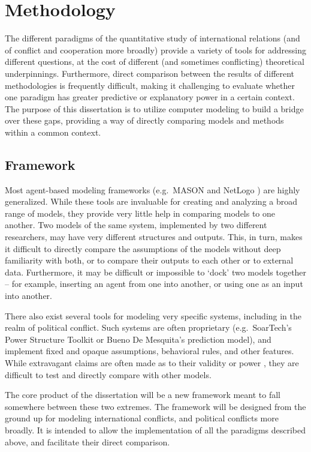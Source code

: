 \section{Methodology}\label{methodology}

The different paradigms of the quantitative study of international relations (and of conflict and cooperation more broadly) provide a variety of tools for addressing different questions, at the cost of different (and sometimes conflicting) theoretical underpinnings. Furthermore, direct comparison between the results of different methodologies is frequently difficult, making it challenging to evaluate whether one paradigm has greater predictive or explanatory power in a certain context. The purpose of this dissertation is to utilize computer modeling to build a bridge over these gaps, providing a way of directly comparing models and methods within a common context.

\subsection{Framework}\label{framework}

Most agent-based modeling frameworks (e.g.~MASON \citep{luke_2005} and NetLogo \citep{wilensky_1999}) are highly generalized. While these tools are invaluable for creating and analyzing a broad range of models, they provide very little help in comparing models to one another. Two models of the same system, implemented by two different researchers, may have very different structures and outputs. This, in turn, makes it difficult to directly compare the assumptions of the models without deep familiarity with both, or to compare their outputs to each other or to external data. Furthermore, it may be difficult or impossible to `dock' \citep{axtell_1996} two models together -- for example, inserting an agent from one into another, or using one as an input into another.

There also exist several tools for modeling very specific systems, including in the realm of political conflict. Such systems are often proprietary (e.g.~SoarTech's Power Structure Toolkit \citep{taylor_2008} or Bueno De Mesquita's prediction model), and implement fixed and opaque assumptions, behavioral rules, and other features. While extravagant claims are often made as to their validity or power \citep{bdm_2010}, they are difficult to test and directly compare with other models.

The core product of the dissertation will be a new framework meant to fall somewhere between these two extremes. The framework will be designed from the ground up for modeling international conflicts, and political conflicts more broadly. It is intended to allow the implementation of all the paradigms described above, and facilitate their direct comparison.

